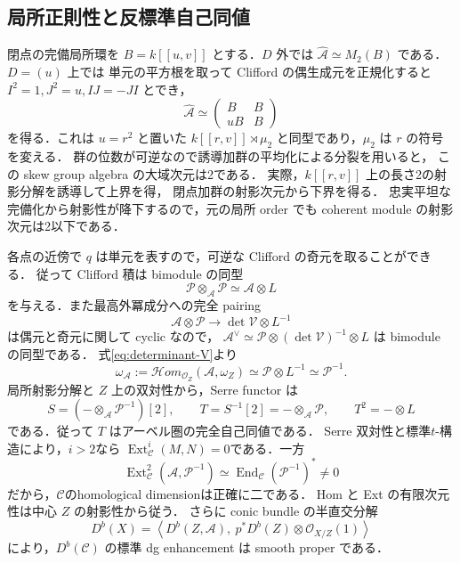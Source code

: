 \subsection{局所正則性と反標準自己同値}

閉点の完備局所環を $B=k[[u,v]]$ とする．$D$ 外では
$\widehat{\mathcal A}\simeq M_2(B)$ である．$D=(u)$ 上では
単元の平方根を取って Clifford の偶生成元を正規化すると
$I^2=1,J^2=u,IJ=-JI$ とでき，
\begin{equation}
 \widehat{\mathcal A}\simeq
 \begin{pmatrix}B&B\\uB&B\end{pmatrix}
 \label{eq:local-order-degree-three}
\end{equation}
を得る．これは $u=r^2$ と置いた
$k[[r,v]]\rtimes\mu_2$ と同型であり，$\mu_2$ は $r$ の符号を変える．
群の位数が可逆なので誘導加群の平均化による分裂を用いると，
この skew group algebra の大域次元は2である．
実際，$k[[r,v]]$ 上の長さ2の射影分解を誘導して上界を得，
閉点加群の射影次元から下界を得る．
忠実平坦な完備化から射影性が降下するので，元の局所 order でも
coherent module の射影次元は2以下である．

各点の近傍で $q$ は単元を表すので，可逆な Clifford の奇元を取ることができる．
従って Clifford 積は bimodule の同型
\begin{equation}
 \mathcal P\otimes_{\mathcal A}\mathcal P\simeq\mathcal A\otimes L
 \label{eq:odd-square}
\end{equation}
を与える．また最高外冪成分への完全 pairing
\[
 \mathcal A\otimes\mathcal P\longrightarrow
       \det\mathcal V\otimes L^{-1}
\]
は偶元と奇元に関して cyclic なので，
$\mathcal A^\vee\simeq
\mathcal P\otimes(\det\mathcal V)^{-1}\otimes L$ は bimodule の同型である．
式\eqref{eq:determinant-V}より
\[
 \omega_{\mathcal A}:=
 \mathcal Hom_{\mathcal O_Z}(\mathcal A,\omega_Z)
 \simeq\mathcal P\otimes L^{-1}\simeq\mathcal P^{-1}.
\]
局所射影分解と $Z$ 上の双対性から，Serre functor は
\begin{equation}
 S=(-\otimes_{\mathcal A}\mathcal P^{-1})[2],\qquad
 T=S^{-1}[2]=-\otimes_{\mathcal A}\mathcal P,
 \qquad T^2=-\otimes L
 \label{eq:Serre-degree-three}
\end{equation}
である．従って $T$ はアーベル圏の完全自己同値である．
Serre 双対性と標準$t$-構造により，$i>2$なら
$\operatorname{Ext}^i_{\mathcal C}(M,N)=0$である．一方
\[
 \operatorname{Ext}^2_{\mathcal C}(\mathcal A,\mathcal P^{-1})
 \simeq\operatorname{End}_{\mathcal C}(\mathcal P^{-1})^*\ne0
\]
だから，$\mathcal C$のhomological dimensionは正確に二である．
Hom と Ext の有限次元性は中心 $Z$ の射影性から従う．
さらに conic bundle の半直交分解\cite[Theorem~4.2]{KuznetsovQuadric}
\begin{equation}
 D^b(X)=\left\langle
 D^b(Z,\mathcal A),\ p^*D^b(Z)\otimes\mathcal O_{X/Z}(1)
 \right\rangle
 \label{eq:conic-sod-degree-three}
\end{equation}
により，$D^b(\mathcal C)$ の標準 dg enhancement は smooth proper である．

